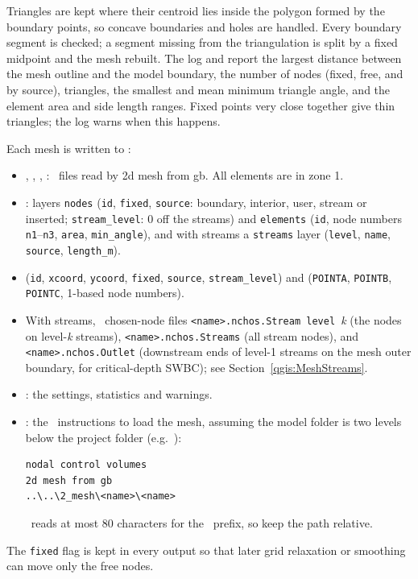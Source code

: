         Triangles are kept where their centroid lies inside the polygon formed by the boundary points, so concave boundaries and holes are handled.  Every boundary segment is checked; a segment missing from the triangulation is split by a fixed midpoint and the mesh rebuilt.  The log and  report the largest distance between the mesh outline and the model boundary, the number of nodes (fixed, free, and by source), triangles, the smallest and mean minimum triangle angle, and the element area and side length ranges.  Fixed points very close together give thin triangles; the log warns when this happens.

        Each mesh is written to :
        \begin{itemize}
        \item {}, , , : \gb\ files read by {\sf 2d mesh from gb}.  All elements are in zone 1.
        \item {}: layers {\tt nodes} ({\tt id}, {\tt fixed}, {\tt source}: boundary, interior, user, stream or inserted; {\tt stream\_level}: 0 off the streams) and {\tt elements} ({\tt id}, node numbers {\tt n1}--{\tt n3}, {\tt area}, {\tt min\_angle}), and with streams a {\tt streams} layer ({\tt level}, {\tt name}, {\tt source}, {\tt length\_m}).
        \item {} ({\tt id}, {\tt xcoord}, {\tt ycoord}, {\tt fixed}, {\tt source}, {\tt stream\_level}) and  ({\tt POINTA}, {\tt POINTB}, {\tt POINTC}, 1-based node numbers).
        \item With streams, \gb\ chosen-node files {\tt <name>.nchos.Stream level }{\em k} (the nodes on level-{\em k} streams), {\tt <name>.nchos.Streams} (all stream nodes), and {\tt <name>.nchos.Outlet} (downstream ends of level-1 streams on the mesh outer boundary, for critical-depth SWBC); see Section~\ref{qgis:MeshStreams}.
        \item {}: the settings, statistics and warnings.
        \item {}: the \mut\ instructions to load the mesh, assuming the model folder is two levels below the project folder (e.g.\ ):
\begin{verbatim}
nodal control volumes
2d mesh from gb
..\..\2_mesh\<name>\<name>
\end{verbatim}
        \mut\ reads at most 80 characters for the \gb\ prefix, so keep the path relative.
        \end{itemize}
        The {\tt fixed} flag is kept in every output so that later grid relaxation or smoothing can move only the free nodes.

